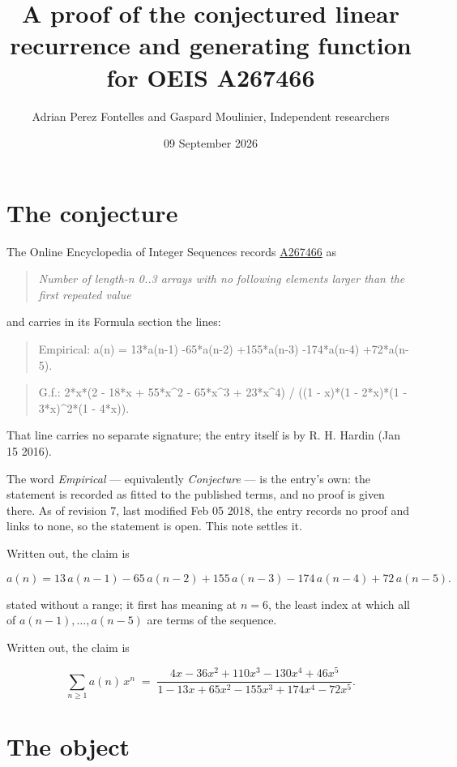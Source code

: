 \documentclass[11pt]{article}
\title{A proof of the conjectured linear recurrence and generating function for OEIS A267466}
\author{Adrian Perez Fontelles and Gaspard Moulinier, Independent researchers}
\date{09 September 2026}
\theoremstyle{definition}
\begin{document}
\maketitle
\section{The conjecture}

The Online Encyclopedia of Integer Sequences records \href{https://oeis.org/A267466}{A267466} as

\begin{quote}\itshape Number of length-n 0..3 arrays with no following elements larger than the first repeated value\end{quote}

and carries in its Formula section the lines:

\begin{quote}\ttfamily Empirical: a(n) = 13*a(n-1) -65*a(n-2) +155*a(n-3) -174*a(n-4) +72*a(n-5).\end{quote}

\begin{quote}\ttfamily G.f.: 2*x*(2 - 18*x + 55*x\textasciicircum{}2 - 65*x\textasciicircum{}3 + 23*x\textasciicircum{}4) / ((1 - x)*(1 - 2*x)*(1 - 3*x)\textasciicircum{}2*(1 - 4*x)).\end{quote}

That line carries no separate signature; the entry itself is by R. H. Hardin (Jan 15 2016).

The word {\itshape Empirical} --- equivalently {\itshape Conjecture} --- is the entry's own: the statement is recorded as fitted to the published terms, and no proof is given there. As of revision 7, last modified Feb 05 2018, the entry records no proof and links to none, so the statement is open. This note settles it.

Written out, the claim is

\[a(n) = 13\,a(n-1) - 65\,a(n-2) + 155\,a(n-3) - 174\,a(n-4) + 72\,a(n-5).\]

stated without a range; it first has meaning at $n = 6$, the least index at which all of $a(n-1),\dots,a(n-5)$ are terms of the sequence.

Written out, the claim is

\[\sum_{n \ge 1} a(n)\,x^n \;=\; \frac{4x - 36x^{2} + 110x^{3} - 130x^{4} + 46x^{5}}{1 - 13x + 65x^{2} - 155x^{3} + 174x^{4} - 72x^{5}}.\]

\section{The object}
\end{document}
